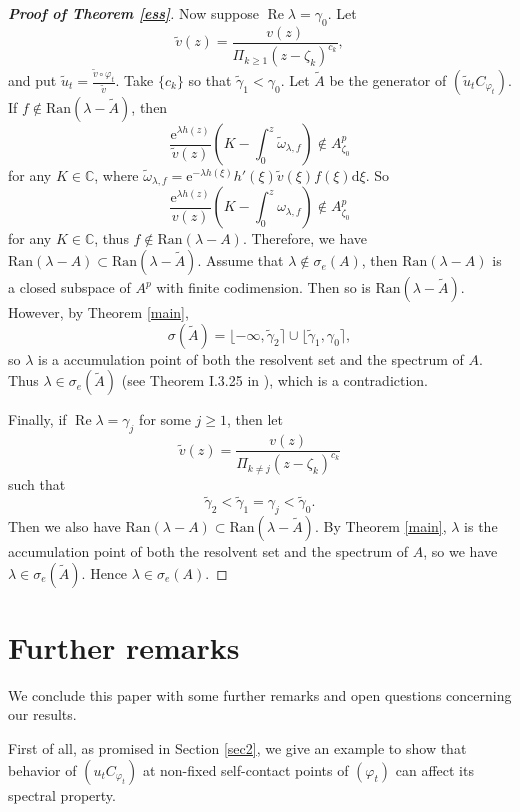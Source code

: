 \documentclass{amsart}
\theoremstyle{proclaim}
\theoremstyle{fancyproclaim}
\theoremstyle{definition}
\theoremstyle{fancystatement}
\numberwithin{equation}{section}
\begin{document}
\begin{proof}[\textbf{Proof of Theorem \ref{ess}}]
Now suppose $\operatorname{Re}\lambda=\gamma_0$. Let 
$$\tilde{v}(z)=\frac{v(z)}{\Pi_{k\geq 1}(z-\zeta_k)^{c_k}},$$
and put $\tilde{u}_t=\frac{\tilde{v}\circ\varphi_t}{\tilde{v}}$. Take $\{c_k\}$ so that $\tilde{\gamma}_1<\gamma_0$. Let $\tilde{A}$ be the generator of $(\tilde{u}_tC_{\varphi_t})$. If $f\notin \mathrm{Ran}(\lambda-\tilde{A})$, then
$$\frac{ \mathrm{e}^{\lambda h(z)}}{\tilde{v}(z)}\left(K-\int_0^z \tilde{\omega}_{\lambda,f}\right)\notin A^p_{\zeta_0}$$
for any $K\in\mathbb{C}$, where $\tilde{\omega}_{\lambda,f}=\mathrm{e}^{-\lambda h(\xi)}h'(\xi)\tilde{v}(\xi)f(\xi) \mathrm{d}\xi.$ So
$$\frac{ \mathrm{e}^{\lambda h(z)}}{v(z)}\left(K-\int_0^z \omega_{\lambda,f}\right)\notin A^p_{\zeta_0}$$
for any $K\in\mathbb{C}$, thus $f\notin \mathrm{Ran}(\lambda-A)$. Therefore, we have $ \mathrm{Ran}(\lambda-A)\subset \mathrm{Ran}(\lambda-\tilde{A}).$ Assume that $\lambda\notin \sigma_e(A)$, then $\mathrm{Ran}(\lambda-A)$ is a closed subspace of $A^p$ with finite codimension. Then so is $\mathrm{Ran}(\lambda-\tilde{A})$. However, by Theorem \ref{main},
$$\sigma(\tilde{A})=\lfloor-\infty, \tilde{\gamma}_2\rceil\cup\lfloor \tilde{\gamma}_1,\gamma_0\rceil,$$
so $\lambda$ is a accumulation point of both the resolvent set and the spectrum of $A$. Thus $\lambda\in\sigma_e(\tilde{A})$ (see Theorem I.3.25 in \cite{book}), which is a contradiction.


Finally, if $\operatorname{Re}\lambda=\gamma_j$ for some $j\geq1$, then let  
$$\tilde{v}(z)=\frac{v(z)}{\Pi_{k\ne j}(z-\zeta_k)^{c_k}}$$ 
such that 
$$\tilde{\gamma}_2<\tilde{\gamma}_1=\gamma_j<\tilde{\gamma}_0.$$
Then we also have $ \mathrm{Ran}(\lambda-A)\subset \mathrm{Ran}(\lambda-\tilde{A}).$ By Theorem \ref{main}, $\lambda$ is the accumulation point of both the  resolvent set and the spectrum of $A$, so we have $\lambda\in\sigma_e(\tilde{A})$. Hence $\lambda\in\sigma_e(A)$.
\end{proof}






\section{Further remarks}\label{further}

We conclude this paper with some further remarks and open questions concerning our results.




First of all, as promised in Section \ref{sec2}, we give an example to show that behavior of $(u_tC_{\varphi_t})$ at non-fixed self-contact points of $(\varphi_t)$ can affect its spectral property.
\end{document}
